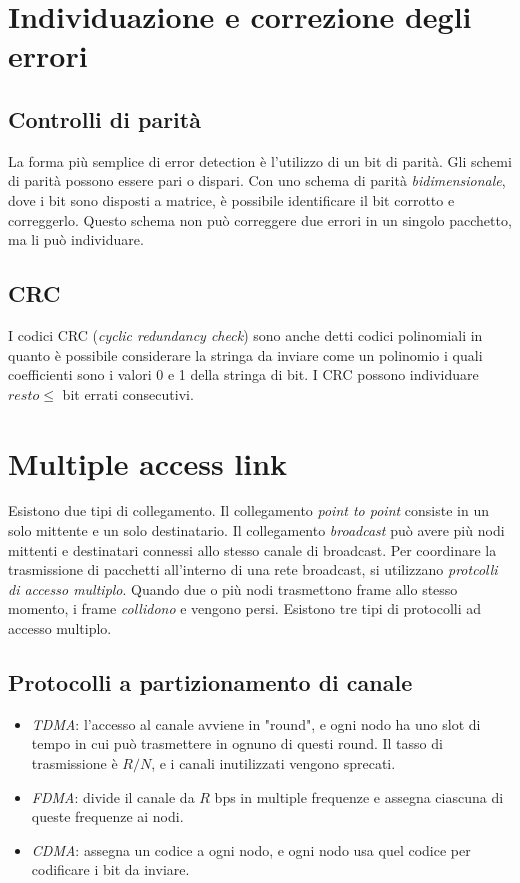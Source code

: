 \documentclass[11pt]{book}
\begin{document}
\section{Individuazione e correzione degli errori}
\subsection{Controlli di parità}
La forma più semplice di error detection è l'utilizzo di un bit di parità. Gli schemi di parità possono essere pari o dispari.
Con uno schema di parità \textit{bidimensionale}, dove i bit sono disposti a matrice, è possibile identificare il bit 
corrotto e correggerlo. Questo schema non può correggere due errori in un singolo pacchetto, ma li può individuare.
\subsection{CRC}
I codici CRC (\textit{cyclic redundancy check}) sono anche detti codici polinomiali in quanto è possibile considerare la 
stringa da inviare come un polinomio i quali coefficienti sono i valori 0 e 1 della stringa di bit. I CRC possono individuare 
$resto\leq$ bit errati consecutivi.
\section{Multiple access link}
Esistono due tipi di collegamento. Il collegamento \textit{point to point} consiste in un solo mittente e un solo destinatario.
Il collegamento \textit{broadcast} può avere più nodi mittenti e destinatari connessi allo stesso canale di broadcast. 
Per coordinare la trasmissione di pacchetti all'interno di una rete broadcast, si utilizzano \textit{protcolli di accesso multiplo}.
Quando due o più nodi trasmettono frame allo stesso momento, i frame \textit{collidono} e vengono persi. Esistono tre tipi
di protocolli ad accesso multiplo.
\subsection{Protocolli a partizionamento di canale}
\begin{itemize}
    \item \textit{TDMA}: l'accesso al canale avviene in "round", e ogni nodo ha uno slot di tempo in cui può trasmettere 
    in ognuno di questi round. Il tasso di trasmissione è $R/N$, e i canali inutilizzati vengono sprecati.
    \item \textit{FDMA}: divide il canale da $R$ bps in multiple frequenze e assegna ciascuna di queste frequenze ai nodi.
    \item \textit{CDMA}: assegna un codice a ogni nodo, e ogni nodo usa quel codice per codificare i bit da inviare.
\end{itemize}
\end{document}
